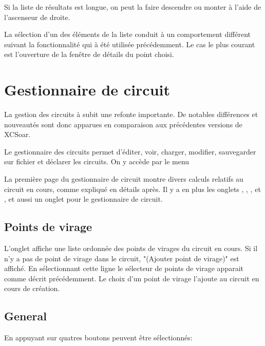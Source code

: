 Si la liste de résultats est longue, on peut la faire descendre ou monter à l'aide de l'ascenseur de droite.

La sélection d'un des éléments de la liste conduit à un comportement différent suivant la fonctionnalité qui à été utilisée précédemment. Le cas le plus courant est l'ouverture de la fenêtre de détails du point choisi.

\section{Gestionnaire de circuit}\label{sec:task-manager-dialog}
\begin{it}  La gestion des circuits à subit une refonte importante. De notables différences et nouveautés sont donc apparues en comparaison aux précédentes versions de XCSoar.\end{it}

Le gestionnaire des circuits permet d'éditer, voir, charger, modifier, sauvegarder sur fichier et déclarer les circuits. On y accède par le menu
\begin{quote}
\blink{}
\end{quote}

La première page du gestionnaire de circuit montre divers calculs relatifs au circuit en cours, comme expliqué en détails après. Il y a en plus les onglets   , , , et  , et aussi un onglet pour  le gestionnaire de circuit.

\subsection*{Points de virage}
L'onglet  affiche une liste ordonnée des points de virages du circuit en cours. Si il n'y a pas de point de virage dans le circuit,  "(Ajouter point de virage)" est affiché. En sélectionnant cette ligne le sélecteur de points de virage apparait comme décrit précédemment. Le choix d'un point de virage l'ajoute au circuit en cours de création.

\subsection*{General}
En appuyant sur  quatres boutons peuvent être sélectionnés:

